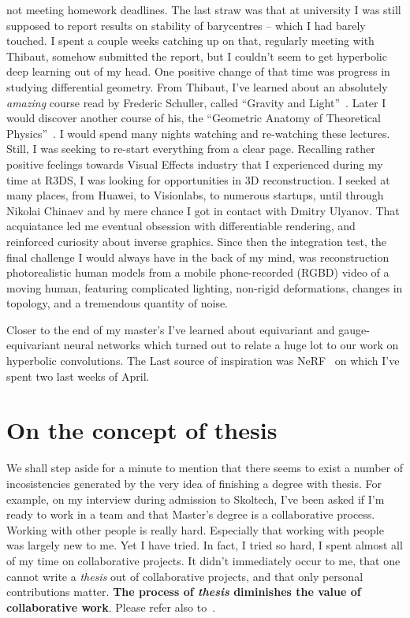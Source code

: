 not meeting homework deadlines. The last straw was that at university I was
still supposed to report results on stability of barycentres -- which I had
barely touched. I spent a couple weeks catching up on that, regularly meeting
with Thibaut, somehow submitted the report, but I couldn't seem to get
hyperbolic deep learning out of my head. One positive change of that time was
progress in studying differential geometry. From Thibaut, I've learned about an
absolutely \emph{amazing} course read by Frederic Schuller, called ``Gravity
and Light''~\citep{gravityLight}.  Later I would discover another course of
his, the ``Geometric Anatomy of Theoretical
Physics''~\citep{geometricAnatomy}. I would spend many nights watching and
re-watching these lectures.
Still, I was seeking to re-start everything from a clear page. Recalling rather
positive feelings towards Visual Effects industry that I experienced during my
time at R3DS, I was looking for opportunities in 3D reconstruction. I seeked at
many places, from Huawei, to Visionlabs, to numerous startups, until through
Nikolai Chinaev and by mere chance I got in contact with Dmitry Ulyanov.  That
acquiatance led me eventual obsession with differentiable rendering, and
reinforced curiosity about inverse graphics. Since then the integration test,
the final challenge I would always have in the back of my mind, was
reconstruction photorealistic human models from a mobile phone-recorded (RGBD)
video of a moving human, featuring complicated lighting, non-rigid
deformations, changes in topology, and a tremendous quantity of noise.

Closer to the end of my master's I've learned about equivariant and
gauge-equivariant neural networks which turned out to relate a huge lot to our
work on hyperbolic convolutions. The Last source of inspiration was
NeRF~\cite{nerf} on which I've spent two last weeks of April.

\section*{On the concept of thesis}

We shall step aside for a minute to mention that there seems to exist a number
of incosistencies generated by the very idea of finishing a degree with thesis.
For example, on my interview during admission to Skoltech, I've been asked if
I'm ready to work in a team and that Master's degree is a collaborative
process. Working with other people is really hard. Especially that working with
people was largely new to me. Yet I have tried. In fact, I tried so hard, I
spent almost all of my time on collaborative projects. It didn't immediately
occur to me, that one cannot write a \emph{thesis} out of collaborative
projects, and that only personal contributions matter.
\textbf{The process of \emph{thesis} diminishes the value of collaborative work}.
Please refer also to~\citet{phdBullshit}.


